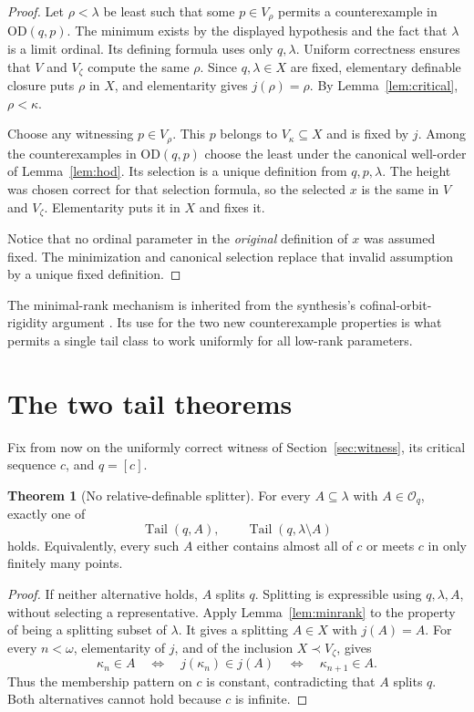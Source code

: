\documentclass[11pt,letterpaper]{article}
\theoremstyle{definition}
\newtheorem{theorem}[definition]{Theorem}
\numberwithin{equation}{section}
\newcommand{\OD}{\mathrm{OD}}
\newcommand{\Tail}{\operatorname{Tail}}
\begin{document}
\begin{proof}
Let $\rho<\lambda$ be least such that some $p\in V_\rho$ permits a
counterexample in $\OD(q,p)$. The minimum exists by the displayed
hypothesis and the fact that $\lambda$ is a limit ordinal.
Its defining formula uses only $q,\lambda$. Uniform correctness
ensures that $V$ and $V_\zeta$ compute the same $\rho$. Since
$q,\lambda\in X$ are fixed, elementary definable closure puts
$\rho$ in $X$, and elementarity gives $j(\rho)=\rho$.
By Lemma~\ref{lem:critical}, $\rho<\kappa$.

Choose any witnessing $p\in V_\rho$. This $p$ belongs to
$V_\kappa\subseteq X$ and is fixed by $j$. Among the counterexamples
in $\OD(q,p)$ choose the least under the canonical well-order of
Lemma~\ref{lem:hod}. Its selection is a unique definition from
$q,p,\lambda$. The height was chosen correct for that selection
formula, so the selected $x$ is the same in $V$ and $V_\zeta$.
Elementarity puts it in $X$ and fixes it.

Notice that no ordinal parameter in the \emph{original} definition of
$x$ was assumed fixed. The minimization and canonical selection
replace that invalid assumption by a unique fixed definition.
\end{proof}

The minimal-rank mechanism is inherited from the synthesis's
cofinal-orbit-rigidity argument \cite{synthesis}. Its use for the two
new counterexample properties is what permits a single tail class to
work uniformly for all low-rank parameters.

\section{The two tail theorems}\label{sec:tailtheorems}

Fix from now on the uniformly correct witness of
Section~\ref{sec:witness}, its critical sequence $c$, and $q=[c]$.

\begin{theorem}[No relative-definable splitter]\label{thm:nosplit}
For every $A\subseteq\lambda$ with $A\in\mathcal O_q$, exactly one of
\[
 \Tail(q,A),\qquad \Tail(q,\lambda\setminus A)
\]
holds. Equivalently, every such $A$ either contains almost all of $c$
or meets $c$ in only finitely many points.
\end{theorem}

\begin{proof}
If neither alternative holds, $A$ splits $q$. Splitting is expressible
using $q,\lambda,A$, without selecting a representative. Apply
Lemma~\ref{lem:minrank} to the property of being a splitting subset of
$\lambda$. It gives a splitting $A\in X$ with $j(A)=A$.
For every $n<\omega$, elementarity of $j$, and of the inclusion
$X\prec V_\zeta$, gives
\[
 \kappa_n\in A
 \quad\Longleftrightarrow\quad
 j(\kappa_n)\in j(A)
 \quad\Longleftrightarrow\quad
 \kappa_{n+1}\in A.
\]
Thus the membership pattern on $c$ is constant, contradicting that
$A$ splits $q$. Both alternatives cannot hold because $c$ is infinite.
\end{proof}
\end{document}
